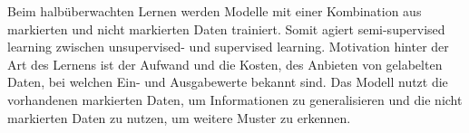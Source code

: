 Beim halbüberwachten Lernen werden Modelle mit einer Kombination aus markierten
und nicht markierten Daten trainiert. Somit agiert semi-supervised learning
zwischen unsupervised- und supervised learning. Motivation hinter der Art des
Lernens ist der Aufwand und die Kosten, des Anbieten von gelabelten Daten, bei
welchen Ein- und Ausgabewerte bekannt sind. \cite{lanquillon2019grundzuge} Das Modell nutzt die vorhandenen
markierten Daten, um Informationen zu generalisieren und die nicht markierten
Daten zu nutzen, um weitere Muster zu erkennen.